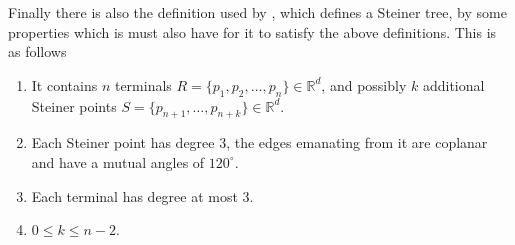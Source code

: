 Finally there is also the definition used by
\textcite{smith1992}, which defines a Steiner tree, by some properties which is
must also have for it to satisfy the above definitions. This is as follows
%
\begin{definition}
\leavevmode\vspace{-\baselineskip}\par
\begin{enumerate}
\item It contains $n$ terminals
  $R = \{ p_1, p_2, \ldots, p_n \} \in \mathbb{R}^d$, and possibly $k$
  additional Steiner points
  $S = \{ p_{n+1}, \ldots, p_{n+k} \} \in \mathbb{R}^d$.
\item Each Steiner point has degree $3$, the edges emanating from it are
  coplanar and have a mutual angles of $120^{\circ}$.
\item Each terminal has degree at most $3$.
\item $0 \le k \le n-2$.
\end{enumerate}
\end{definition}
%
